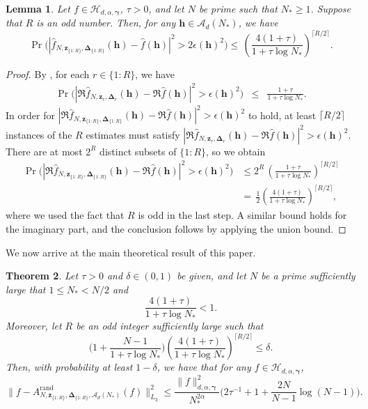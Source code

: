 \documentclass[pdflatex,sn-basic,Numbered]{sn-jnl}%
\newcommand{\rand}{\mathrm{rand}}
\newcommand{\bsh}{\boldsymbol{h}}
\newcommand{\bsz}{\boldsymbol{z}}
\newcommand{\bsgamma}{\boldsymbol{\gamma}}
\newcommand{\bsDelta}{\boldsymbol{\Delta}}
\newcommand{\Acal}{\mathcal{A}}
\newcommand{\Hcal}{\mathcal{H}}
\theoremstyle{thmstyleone}%
\newtheorem{theorem}{Theorem}%
\newtheorem{lemma}[theorem]{Lemma}
\theoremstyle{thmstyletwo}%
\begin{document}
\begin{lemma}\label{lem:medianbound} 
    Let $f\in\Hcal_{d,\alpha,\bsgamma}$, $\tau>0$, and let $N$ be prime such that $N_*\geq 1$. Suppose that $R$ is an odd number. Then, for any $\bsh\in\Acal_d (N_*)$, we have
        \[ 
        \Pr\Big(|\widehat{f}_{N,\bsz_{\{1{:}R\}},\bsDelta_{\{1{:}R\}}}(\bsh)-\widehat{f}(\bsh)|^2> 2\epsilon(\bsh)^2\Big)
        \le  \,  \left(\frac{4(1+\tau)}{1+\tau\log N_* }\right)^{\lceil R/2 \rceil}.
        \]
\end{lemma}
\begin{proof} 
    By , for each $r\in \{1{:}R\}$, we have
    \begin{eqnarray*}
    \Pr\Big(|\Re\widehat{f}_{N,\bsz_r,\bsDelta_r}(\bsh)-\Re\widehat{f}(\bsh)|^2> \epsilon(\bsh)^2\Big)
    &\le& \frac{1+\tau}{1+\tau\log N_* }. 
    \end{eqnarray*}
    In order for $|\Re\widehat{f}_{N,\bsz_{\{1{:}R\}},\bsDelta_{\{1{:}R\}}}(\bsh)-\Re\widehat{f}(\bsh)|^2>\epsilon(\bsh)^2$ to hold, at least $\lceil R/2\rceil$ instances of the $R$ estimates must satisfy $|\Re\widehat{f}_{N,\bsz_r,\bsDelta_r}(\bsh)-\Re\widehat{f}(\bsh)|^2> \epsilon(\bsh)^2$. There are at most $2^R$ distinct subsets of $\{1{:}R\}$, so we obtain
    \begin{align*}
        \Pr\Big(|\Re\widehat{f}_{N,\bsz_{\{1{:}R\}},\bsDelta_{\{1{:}R\}}}(\bsh)-\Re\widehat{f}(\bsh)|^2> \epsilon(\bsh)^2\Big)
         &\le 2^R \,  \left(\frac{1+\tau}{1+\tau\log N_* } \right)^{\lceil R/2 \rceil}\\
        & = \,  \frac{1}{2}\left(\frac{4(1+\tau)}{1+\tau\log N_* }\right)^{\lceil R/2 \rceil},
    \end{align*}
    where we used the fact that $R$ is odd in the last step.
    A similar bound holds for the imaginary part, and the conclusion follows by applying the union bound.     
\end{proof}

We now arrive at the main theoretical result of this paper.
\begin{theorem}\label{thm:L2rate_constants}
    Let $\tau>0$ and $\delta \in (0,1)$ be given, and let $N$ be a prime sufficiently large that $1\leq N_*< N/2$ and
    \begin{equation}\label{eq:less_than_one}
    \frac{4(1+\tau)}{1+\tau\log N_* }<1.
    \end{equation}
    Moreover, let $R$ be an odd integer sufficiently large such that
    \begin{equation}\label{eq:choose_R_first}
    \Big(1+\frac{N-1}{1+\tau\log N_*}\Big)
    \left(\frac{4(1+\tau)}{1+\tau\log N_* }\right)^{\lceil R/2 \rceil}\le \delta.
    \end{equation}
    Then, with probability at least $1-\delta$, we have that for any $f\in \Hcal_{d,\alpha,\bsgamma}$,
    \[ \|f-A^{\rand}_{N,\bsz_{\{1{:}R\}},\bsDelta_{\{1{:}R\}},\Acal_d(N_*)}(f)\|^2_{L_2}\le \frac{\|f\|^2_{d,\alpha,\bsgamma}}{N^{2\alpha}_*}\Big(2\tau^{-1}+1 + \frac{2N}{N-1}\log(N-1) \Big).\]
\end{theorem}
\end{document}

